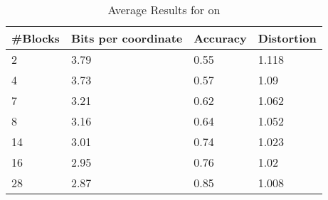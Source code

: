 \begin{table}[h]
	\centering
	\caption{Average Results for \qsr{} on  \mnist{}}
	\label{table:avg_mnist_qsr1}
	\begin{tabular}{l l l l}
		\hline
		\#Blocks & Bits per coordinate & Accuracy  & Distortion \\ \hline
		2 & 3.79 & 0.55 & 1.118  \\
		4 & 3.73 & 0.57 & 1.09  \\
		7 & 3.21 & 0.62 & 1.062 \\
		8 & 3.16 & 0.64 & 1.052 \\
		14 & 3.01 & 0.74 & 1.023 \\
		16 & 2.95 & 0.76 & 1.02 \\
		28 & 2.87 & 0.85 & 1.008 \\
		\hline
	\end{tabular}
\end{table}
